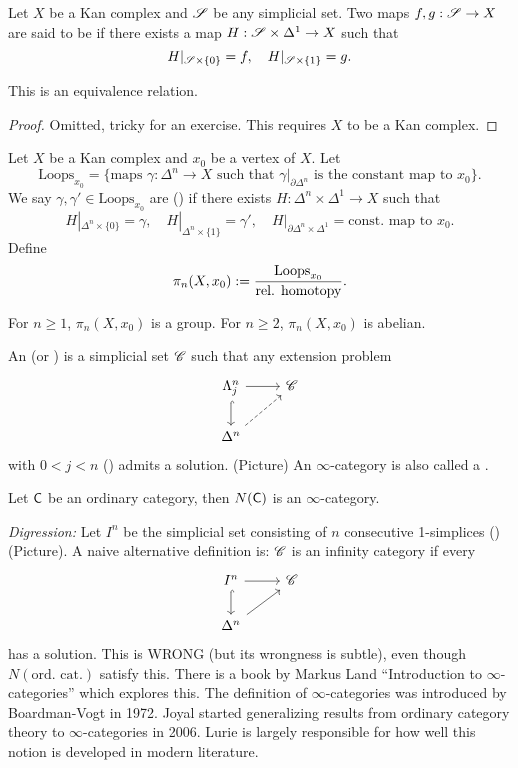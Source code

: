\begin{definition}
	Let $X$ be a Kan complex and $\mathscr S$ be any simplicial set. Two maps $f,g:\CS\to X$ are said to be  if there exists a map $H:\CS\times \Delta^{1}\to X$ such that
	\[
	H|_{\mathscr S\times \{0\} } = f,\quad H|_{\mathscr S\times \{1\} } = g.
	\] 
\end{definition}
\begin{lemma}
	This is an equivalence relation.
\end{lemma}
\begin{proof}
	Omitted, tricky for an exercise. This requires $X$ to be a Kan complex.
\end{proof}
\begin{definition}
	Let $X$ be a Kan complex and $x_0$ be a vertex of $X$. Let 
	\[
	\text{Loops}_{x_0} = \{\text{maps }\gamma:\Delta^{n}\to X\text{ such that }\gamma|_{\partial\Delta^{n}}\text{ is the constant map to }x_0\}. 
	\] 
	We say $\gamma,\gamma'\in \text{Loops}_{x_0}$ are  () if there exists $H:\Delta^{n}\times \Delta^{1}\to X$ such that
	\[
	H|_{\Delta^{n}\times \{0\} } = \gamma,\quad H|_{\Delta^{n}\times \{1\} } = \gamma',\quad H|_{\partial \Delta^{n}\times \Delta^{1}} = \text{const. map to }x_0.
	\] 
	Define
	\[
		\pi_n(X,x_0) := \frac{\text{Loops}_{x_0}}{\text{rel. homotopy}}.
	\] 
\end{definition}
\begin{fact}
	For $n\ge 1$, $\pi_n(X,x_0)$ is a group. For $n\ge 2$, $\pi_n(X,x_0)$ is abelian.
\end{fact}
\begin{definition}
	An  (or ) is a simplicial set $\mathscr C$ such that any extension problem
	\[
	\begin{tikzcd}
		\Lambda_{j}^{n} \ar[r] \ar[d,hook] & \CC \\
		\Delta^{n} \ar[ur, dashed]
	\end{tikzcd}
	\] 
	with $0<j<n$ () admits a solution. (Picture) An $\infty$-category is also called a .
\end{definition}
\begin{lemma}
	Let $\mathsf{C}$ be an ordinary category, then $N(\mathsf{C})$ is an $\infty$-category.
\end{lemma}
\emph{Digression:} Let $I^{n}$ be the simplicial set consisting of $n$ consecutive 1-simplices () (Picture). A naive alternative definition is: $\mathscr C$ is an infinity category if every
\[
\begin{tikzcd}
	I^{n} \ar[r] \ar[d,hook] & \CC \\
	\Delta^{n} \ar[ur]
\end{tikzcd}
\] 
has a solution. This is WRONG (but its wrongness is subtle), even though $N(\text{ord. cat.})$ satisfy this. There is a book by Markus Land ``Introduction to $\infty$-categories'' which explores this. The definition of $\infty$-categories was introduced by Boardman-Vogt in 1972. Joyal started generalizing results from ordinary category theory to $\infty$-categories in 2006. Lurie is largely responsible for how well this notion is developed in modern literature.


